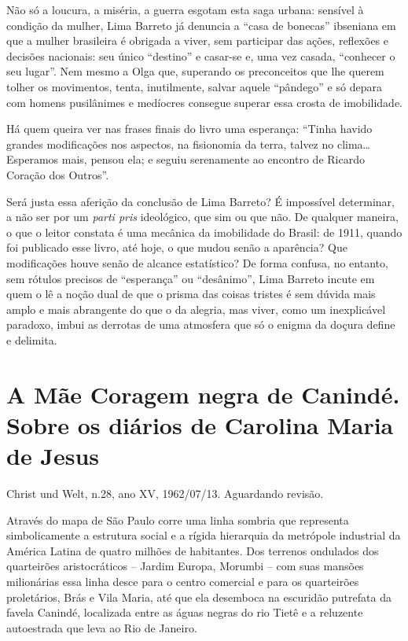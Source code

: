 \documentclass[
  letterpaper,
  DIV=11,
  numbers=noendperiod]{scrreprt}
\begin{document}
Não só a loucura, a miséria, a guerra esgotam esta saga urbana: sensível
à condição da mulher, Lima Barreto já denuncia a ``casa de bonecas''
ibseniana em que a mulher brasileira é obrigada a viver, sem participar
das ações, reflexões e decisões nacionais: seu único ``destino'' e
casar-se e, uma vez casada, ``conhecer o seu lugar''. Nem mesmo a Olga
que, superando os preconceitos que lhe querem tolher os movimentos,
tenta, inutilmente, salvar aquele ``pândego'' e só depara com homens
pusilânimes e medíocres consegue superar essa crosta de imobilidade.

Há quem queira ver nas frases finais do livro uma esperança: ``Tinha
havido grandes modificações nos aspectos, na fisionomia da terra, talvez
no clima\ldots{} Esperamos mais, pensou ela; e seguiu serenamente ao
encontro de Ricardo Coração dos Outros''.

Será justa essa aferição da conclusão de Lima Barreto? É impossível
determinar, a não ser por um \emph{parti pris} ideológico, que sim ou
que não. De qualquer maneira, o que o leitor constata é uma mecânica da
imobilidade do Brasil: de 1911, quando foi publicado esse livro, até
hoje, o que mudou senão a aparência? Que modificações houve senão de
alcance estatístico? De forma confusa, no entanto, sem rótulos precisos
de ``esperança'' ou ``desânimo'', Lima Barreto incute em quem o lê a
noção dual de que o prisma das coisas tristes é sem dúvida mais amplo e
mais abrangente do que o da alegria, mas viver, como um inexplicável
paradoxo, imbui as derrotas de uma atmosfera que só o enigma da doçura
define e delimita.

\chapter{A Mãe Coragem negra de Canindé. Sobre os diários de Carolina
Maria de
Jesus}\label{a-muxe3e-coragem-negra-de-caninduxe9.-sobre-os-diuxe1rios-de-carolina-maria-de-jesus}

Christ und Welt, n.28, ano XV, 1962/07/13. Aguardando revisão.

\hfill\break

Através do mapa de São Paulo corre uma linha sombria que representa
simbolicamente a estrutura social e a rígida hierarquia da metrópole
industrial da América Latina de quatro milhões de habitantes. Dos
terrenos ondulados dos quarteirões aristocráticos -- Jardim Europa,
Morumbi -- com suas mansões milionárias essa linha desce para o centro
comercial e para os quarteirões proletários, Brás e Vila Maria, até que
ela desemboca na escuridão putrefata da favela Canindé, localizada entre
as águas negras do rio Tietê e a reluzente autoestrada que leva ao Rio
de Janeiro.
\end{document}
